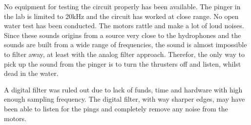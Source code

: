 No equipment for testing the circuit properly has been available. The pinger in the lab is limited to 20kHz and the circuit has worked at close range. No open water test has been conducted. The motors rattle and make a lot of loud noises. Since these sounds origins from a source very close to the hydrophones and the sounds are built from a wide range of frequencies, the sound is almost impossible to filter away, at least with the analog filter approach. Therefor, the only way to pick up the sound from the pinger is to turn the thrusters off and listen, whilst dead in the water.

A digital filter was ruled out due to lack of funds, time and hardware with high enough sampling frequency. The digital filter, with way sharper edges, may have been able to listen for the pings and completely remove any noise from the motors.  	
